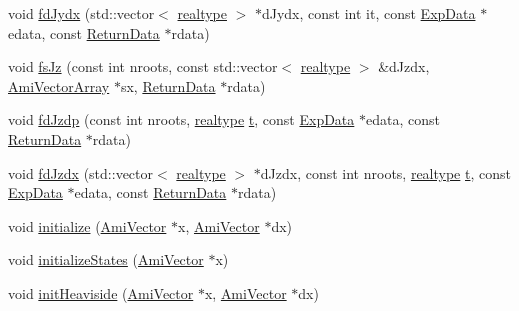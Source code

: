 \begin{DoxyCompactItemize}
\item 
void \mbox{\hyperlink{classamici_1_1_model_a7f392b9e7de5dff5082768c465a1d753}{fd\+Jydx}} (std\+::vector$<$ \mbox{\hyperlink{namespaceamici_a1bdce28051d6a53868f7ccbf5f2c14a3}{realtype}} $>$ $\ast$d\+Jydx, const int it, const \mbox{\hyperlink{classamici_1_1_exp_data}{Exp\+Data}} $\ast$edata, const \mbox{\hyperlink{classamici_1_1_return_data}{Return\+Data}} $\ast$rdata)
\item 
void \mbox{\hyperlink{classamici_1_1_model_aa1f1b2d47c20bcf7147cd3b9149109d3}{fs\+Jz}} (const int nroots, const std\+::vector$<$ \mbox{\hyperlink{namespaceamici_a1bdce28051d6a53868f7ccbf5f2c14a3}{realtype}} $>$ \&d\+Jzdx, \mbox{\hyperlink{classamici_1_1_ami_vector_array}{Ami\+Vector\+Array}} $\ast$sx, \mbox{\hyperlink{classamici_1_1_return_data}{Return\+Data}} $\ast$rdata)
\item 
void \mbox{\hyperlink{classamici_1_1_model_a86a7134f894b152a68f904b22cee04d1}{fd\+Jzdp}} (const int nroots, \mbox{\hyperlink{namespaceamici_a1bdce28051d6a53868f7ccbf5f2c14a3}{realtype}} \mbox{\hyperlink{classamici_1_1_model_a711281d57e9710226face29151cc4641}{t}}, const \mbox{\hyperlink{classamici_1_1_exp_data}{Exp\+Data}} $\ast$edata, const \mbox{\hyperlink{classamici_1_1_return_data}{Return\+Data}} $\ast$rdata)
\item 
void \mbox{\hyperlink{classamici_1_1_model_a588e7cb4790ce3b77700a3acef1c43fc}{fd\+Jzdx}} (std\+::vector$<$ \mbox{\hyperlink{namespaceamici_a1bdce28051d6a53868f7ccbf5f2c14a3}{realtype}} $>$ $\ast$d\+Jzdx, const int nroots, \mbox{\hyperlink{namespaceamici_a1bdce28051d6a53868f7ccbf5f2c14a3}{realtype}} \mbox{\hyperlink{classamici_1_1_model_a711281d57e9710226face29151cc4641}{t}}, const \mbox{\hyperlink{classamici_1_1_exp_data}{Exp\+Data}} $\ast$edata, const \mbox{\hyperlink{classamici_1_1_return_data}{Return\+Data}} $\ast$rdata)
\item 
void \mbox{\hyperlink{classamici_1_1_model_a4d8f308f15a126dde571f2e26787d3e8}{initialize}} (\mbox{\hyperlink{classamici_1_1_ami_vector}{Ami\+Vector}} $\ast$x, \mbox{\hyperlink{classamici_1_1_ami_vector}{Ami\+Vector}} $\ast$dx)
\item 
void \mbox{\hyperlink{classamici_1_1_model_a73d147a7108479e20833ba816cac0f6b}{initialize\+States}} (\mbox{\hyperlink{classamici_1_1_ami_vector}{Ami\+Vector}} $\ast$x)
\item 
void \mbox{\hyperlink{classamici_1_1_model_afc1c1ffc33f397ed131f85c8321dd677}{init\+Heaviside}} (\mbox{\hyperlink{classamici_1_1_ami_vector}{Ami\+Vector}} $\ast$x, \mbox{\hyperlink{classamici_1_1_ami_vector}{Ami\+Vector}} $\ast$dx)

\end{DoxyCompactItemize}
